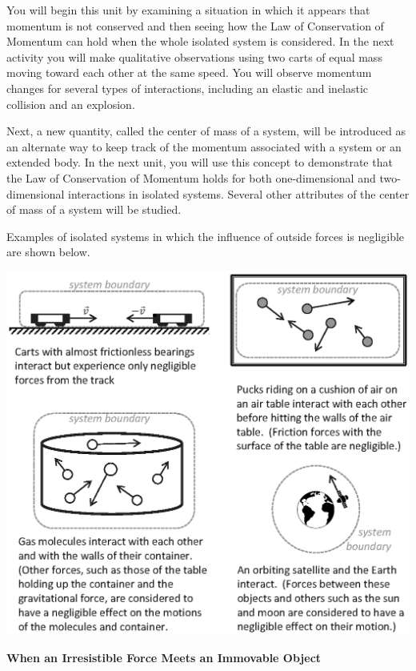 You will begin this unit by examining a situation in which it appears that momentum
is not conserved and then seeing how the Law of Conservation of Momentum can
hold when the whole isolated system is considered. In the next activity you
will make qualitative observations using two carts of equal mass moving toward
each other at the same speed. You will observe momentum changes for several
types of interactions, including an elastic and inelastic collision and an explosion. 

Next, a new quantity, called the center of mass of a system, will be introduced
as an alternate way to keep track of the momentum associated with a system or
an extended body. In the next unit, you will use this concept to demonstrate
that the Law of Conservation of Momentum holds for both one-dimensional and
two-dimensional interactions in isolated systems. Several other attributes of
the center of mass of a system will be studied.

Examples of isolated systems in which the influence of outside forces is negligible
are shown below.

{\par\centering \includegraphics[scale=0.9]{mom_cons/mom_cons_fig1_new.eps} \par}

\textbf{When an Irresistible Force Meets an Immovable Object }

